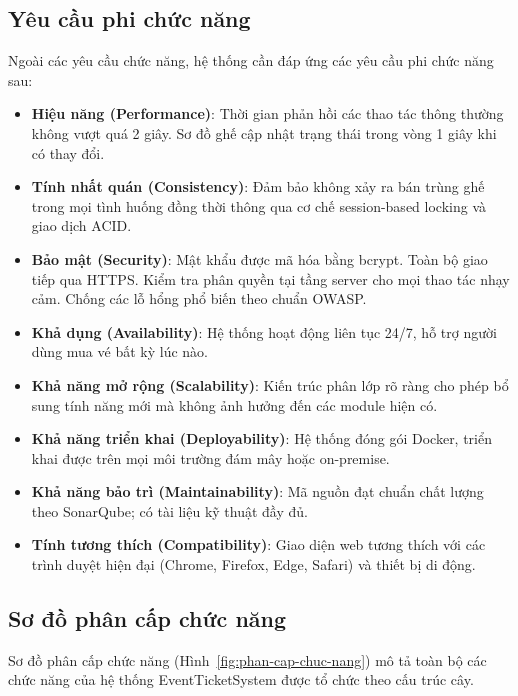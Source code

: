 \documentclass[../main.tex]{subfiles}
\begin{document}
\subsection{Yêu cầu phi chức năng}

Ngoài các yêu cầu chức năng, hệ thống cần đáp ứng các yêu cầu phi chức năng sau:

\begin{itemize}
    \item \textbf{Hiệu năng (Performance)}: Thời gian phản hồi các thao tác thông thường không vượt quá 2 giây. Sơ đồ ghế cập nhật trạng thái trong vòng 1 giây khi có thay đổi.
    \item \textbf{Tính nhất quán (Consistency)}: Đảm bảo không xảy ra bán trùng ghế trong mọi tình huống đồng thời thông qua cơ chế session-based locking và giao dịch ACID.
    \item \textbf{Bảo mật (Security)}: Mật khẩu được mã hóa bằng bcrypt. Toàn bộ giao tiếp qua HTTPS. Kiểm tra phân quyền tại tầng server cho mọi thao tác nhạy cảm. Chống các lỗ hổng phổ biến theo chuẩn OWASP.
    \item \textbf{Khả dụng (Availability)}: Hệ thống hoạt động liên tục 24/7, hỗ trợ người dùng mua vé bất kỳ lúc nào.
    \item \textbf{Khả năng mở rộng (Scalability)}: Kiến trúc phân lớp rõ ràng cho phép bổ sung tính năng mới mà không ảnh hưởng đến các module hiện có.
    \item \textbf{Khả năng triển khai (Deployability)}: Hệ thống đóng gói Docker, triển khai được trên mọi môi trường đám mây hoặc on-premise.
    \item \textbf{Khả năng bảo trì (Maintainability)}: Mã nguồn đạt chuẩn chất lượng theo SonarQube; có tài liệu kỹ thuật đầy đủ.
    \item \textbf{Tính tương thích (Compatibility)}: Giao diện web tương thích với các trình duyệt hiện đại (Chrome, Firefox, Edge, Safari) và thiết bị di động.
\end{itemize}

\subsection{Sơ đồ phân cấp chức năng}

Sơ đồ phân cấp chức năng (Hình~\ref{fig:phan-cap-chuc-nang}) mô tả toàn bộ các chức năng của hệ thống EventTicketSystem được tổ chức theo cấu trúc cây.
\end{document}

